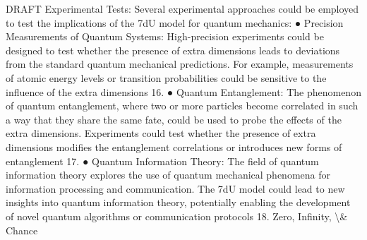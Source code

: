\documentclass[12pt]{article}
\begin{document}
DRAFT
Experimental Tests:
Several experimental approaches could be employed to test the implications of the 7dU
model for quantum mechanics:
●
Precision Measurements of Quantum Systems: High-precision experiments could
be designed to test whether the presence of extra dimensions leads to deviations
from the standard quantum mechanical predictions. For example, measurements of
atomic energy levels or transition probabilities could be sensitive to the inﬂuence of
the extra dimensions 16.
●
Quantum Entanglement: The phenomenon of quantum entanglement, where two or
more particles become correlated in such a way that they share the same fate,
could be used to probe the eﬀects of the extra dimensions. Experiments could test
whether the presence of extra dimensions modiﬁes the entanglement correlations or
introduces new forms of entanglement 17.
●
Quantum Information Theory: The ﬁeld of quantum information theory explores the
use of quantum mechanical phenomena for information processing and
communication. The 7dU model could lead to new insights into quantum
information theory, potentially enabling the development of novel quantum
algorithms or communication protocols 18.
Zero, Infinity, \textbackslash{}& Chance
\end{document}
